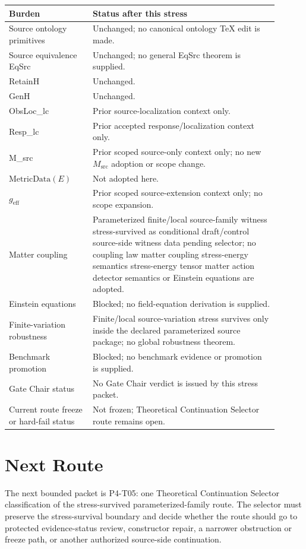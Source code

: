 \documentclass[11pt]{article}
\newcommand{\MetricData}{\mathrm{MetricData}}
\newcommand{\geff}{g_{\mathrm{eff}}}
\newcommand{\Msrc}{M_{\mathrm{src}}}
\begin{document}
\begin{longtable}{p{0.28\linewidth}p{0.62\linewidth}}
\toprule
Burden & Status after this stress \\
\midrule
Source ontology primitives & Unchanged; no canonical ontology TeX edit is made. \\
Source equivalence EqSrc & Unchanged; no general EqSrc theorem is supplied. \\
RetainH & Unchanged. \\
GenH & Unchanged. \\
ObsLoc\_lc & Prior source-localization context only. \\
Resp\_lc & Prior accepted response/localization context only. \\
M\_src & Prior scoped source-only context only; no new \(\Msrc\) adoption or scope change. \\
\(\MetricData(E)\) & Not adopted here. \\
\(\geff\) & Prior scoped source-extension context only; no scope expansion. \\
Matter coupling & Parameterized finite/local source-family witness stress-survived as conditional draft/control source-side witness data pending selector; no coupling law matter coupling stress-energy semantics stress-energy tensor matter action detector semantics or Einstein equations are adopted. \\
Einstein equations & Blocked; no field-equation derivation is supplied. \\
Finite-variation robustness & Finite/local source-variation stress survives only inside the declared parameterized source package; no global robustness theorem. \\
Benchmark promotion & Blocked; no benchmark evidence or promotion is supplied. \\
Gate Chair status & No Gate Chair verdict is issued by this stress packet. \\
Current route freeze or hard-fail status & Not frozen; Theoretical Continuation Selector route remains open. \\
\bottomrule
\end{longtable}

\section{Next Route}

The next bounded packet is P4-T05: one Theoretical Continuation Selector
classification of the stress-survived parameterized-family route. The selector
must preserve the stress-survival boundary and decide whether the route should
go to protected evidence-status review, constructor repair, a narrower
obstruction or freeze path, or another authorized source-side continuation.
\end{document}
